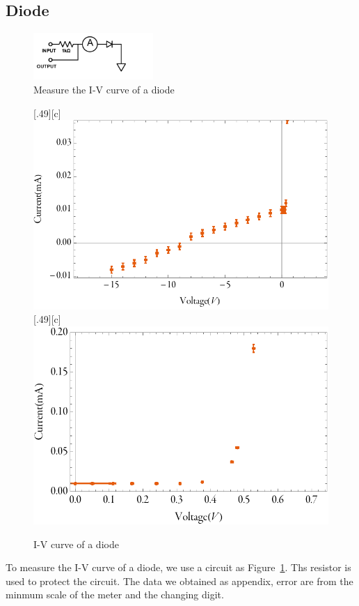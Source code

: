 \documentclass[aps,prl,reprint]{revtex4-1}
\begin{document}
    \subsection{Diode}
    \begin{figure}[H]
        \centering
        \includegraphics[height=0.7in]{image/Diode-Lab.pdf}
        \caption{Measure the I-V curve of a diode}
        \label{fig:diodeLab}
    \end{figure}

    \begin{figure}[t]
    \centering
    [.49\linewidth][c]{%
        \includegraphics[width=.4\linewidth]{image/Diode-Plot.pdf}}\quad
    [.49\linewidth][c]{%
        \includegraphics[width=.4\linewidth]{image/Diode-Plot-Close.pdf}}
    \caption{I-V curve of a diode}
    \label{fig:diodePlot}
    \end{figure}
    To measure the I-V curve of a diode, we use a circuit as Figure~\ref{fig:diodeLab}. Ths resistor is used to protect the circuit. The data we obtained as appendix, error are from the minmum scale of the meter and the changing digit. 
\end{document}
